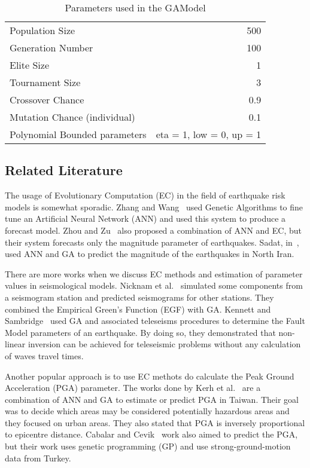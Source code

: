 \begin{table}[H]
  \caption{Parameters used in the GAModel}
  \label{GAParameters5.1}
  \begin{center}
    \begin{tabular}{|l|r|}
      \hline
      Population Size & 500\\
      Generation Number & 100\\
      Elite Size & 1\\
      Tournament Size & 3\\
      Crossover Chance & 0.9\\
      Mutation Chance (individual) & 0.1\\
      Polynomial Bounded parameters & eta = 1, low = 0, up = 1\\
      \hline    
    \end{tabular}
  \end{center}
\end{table}

\subsection{Related Literature}

The usage of Evolutionary Computation (EC) in the field of earthquake
risk models is somewhat sporadic. Zhang and Wang~\cite{Zhang2012} used
Genetic Algorithms to fine tune an Artificial Neural Network (ANN) and
used this system to produce a forecast model. Zhou and
Zu~\cite{Feiyan2014} also proposed a combination of ANN and EC, but
their system forecasts only the magnitude parameter of
earthquakes. Sadat, in~\cite{sadat2015application}, used ANN and GA to
predict the magnitude of the earthquakes in North Iran.

There are more works when we discuss EC methods and estimation of
parameter values in seismological models. Nicknam et
al.~\cite{Nicknam2010} simulated some components from a seismogram
station and predicted seismograms for other stations. They combined
the Empirical Green’s Function (EGF) with GA. Kennett and
Sambridge~\cite{Kennett1992} used GA and associated teleseisms
procedures to determine the Fault Model parameters of an
earthquake. By doing so, they demonstrated that non-linear inversion
can be achieved for teleseismic problems without any calculation of
waves travel times.

Another popular approach is to use EC methots do calculate the Peak
Ground Acceleration (PGA) parameter. The works done by Kerh et
al.~\cite{Kerh2010, Kerh2015} are a combination of ANN and GA to
estimate or predict PGA in Taiwan. Their goal was to decide which
areas may be considered potentially hazardous areas and they focused
on urban areas. They also stated that PGA is inversely proportional to
epicentre distance. Cabalar and Cevik~\cite{Cabalar2009} work also
aimed to predict the PGA, but their work uses genetic programming (GP)
and use strong-ground-motion data from Turkey.

